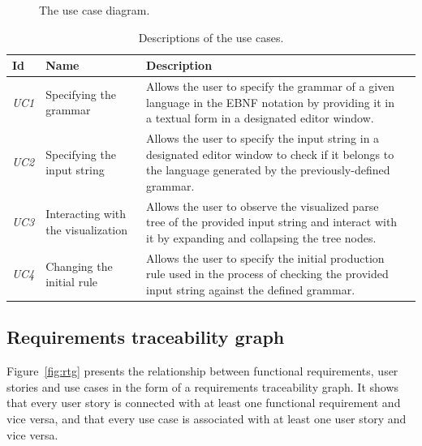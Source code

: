 \documentclass[english,engineering]{wizthesis}
\begin{document}
\begin{figure}[H]
  \centering
  \resizebox{0.75\textwidth}{!}{\fontsize{9}{10}}
  \caption{The use case diagram.}
  \label{fig:use-case-diagram}
\end{figure}

\begin{xltabular}{\textwidth}{@{}lL{3cm}Xl@{}}
  \caption{Descriptions of the use cases.}
  \label{tab:use-cases}\\
  \toprule
  Id & Name & Description \\* \midrule
  \endfirsthead
  \endhead
  \endfoot
  \endlastfoot
  \emph{UC1} & Specifying the grammar & Allows the user to specify the grammar
  of a given language in the EBNF notation by providing it in a textual form in
  a designated editor window. \\
  \addlinespace[0.5em] \emph{UC2} & Specifying the input string & Allows the
  user to specify the input string in a designated editor window to check if it
  belongs to the language generated by the previously-defined grammar. \\
  \addlinespace[0.5em] \emph{UC3} & Interacting with the visualization & Allows
  the user to observe the visualized parse tree of the provided input string and
  interact with it by expanding and collapsing the tree nodes. \\
  \addlinespace[0.5em] \emph{UC4} & Changing the initial rule & Allows the user
  to specify the initial production rule used in the process of checking the
  provided input string against the defined grammar. \\* \bottomrule
\end{xltabular}

\subsection{Requirements traceability graph}

Figure~\ref{fig:rtg} presents the relationship between functional requirements,
user stories and use cases in the form of a requirements traceability graph. It
shows that every user story is connected with at least one functional
requirement and vice versa, and that every use case is associated with at least
one user story and vice versa.
\end{document}
